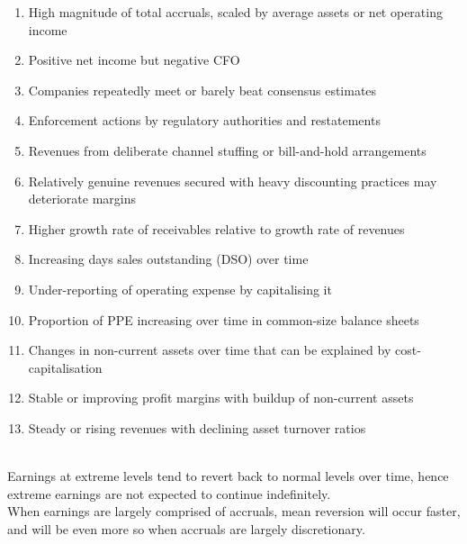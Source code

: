 \begin{remark} 
\begin{enumerate}[label=\roman*.]
\setlength{\itemsep}{0pt}
\item High magnitude of total accruals, scaled by average assets or net operating income
\item Positive net income but negative CFO
\item Companies repeatedly meet or barely beat consensus estimates
\item Enforcement actions by regulatory authorities and restatements
\item Revenues from deliberate channel stuffing or bill-and-hold arrangements
\item Relatively genuine revenues secured with heavy discounting practices may deteriorate margins
\item Higher growth rate of receivables relative to growth rate of revenues
\item Increasing days sales outstanding (DSO) over time
\item Under-reporting of operating expense by capitalising it
\item Proportion of PPE increasing over time in common-size balance sheets
\item Changes in non-current assets over time that can be explained by cost-capitalisation
\item Stable or improving profit margins with buildup of non-current assets
\item Steady or rising revenues with declining asset turnover ratios
\end{enumerate}
\end{remark}

\begin{remark} \\
Earnings at extreme levels tend to revert back to normal levels over time, hence extreme earnings are not expected to continue indefinitely.\\
When earnings are largely comprised of accruals, mean reversion will occur faster, and will be even more so when accruals are largely discretionary.
\end{remark}


